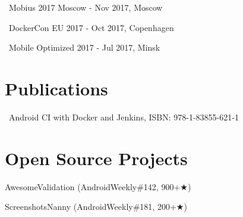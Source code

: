 \documentclass{cv}
\begin{document}
\faMicrophone\ Mobius 2017 Moscow - Nov 2017, Moscow

\faMicrophone\ DockerCon EU 2017 - Oct 2017, Copenhagen

\faMicrophone\ Mobile Optimized 2017 - Jul 2017, Minsk
~\\

\section*{Publications}

\faBook\ Android CI with Docker and Jenkins, ISBN: 978-1-83855-621-1
~\\

\section*{Open Source Projects}

AwesomeValidation (AndroidWeekly\#142, 900+{\DejaVuSans ★})

ScreenshotsNanny (AndroidWeekly\#181, 200+{\DejaVuSans ★})
\end{document}
